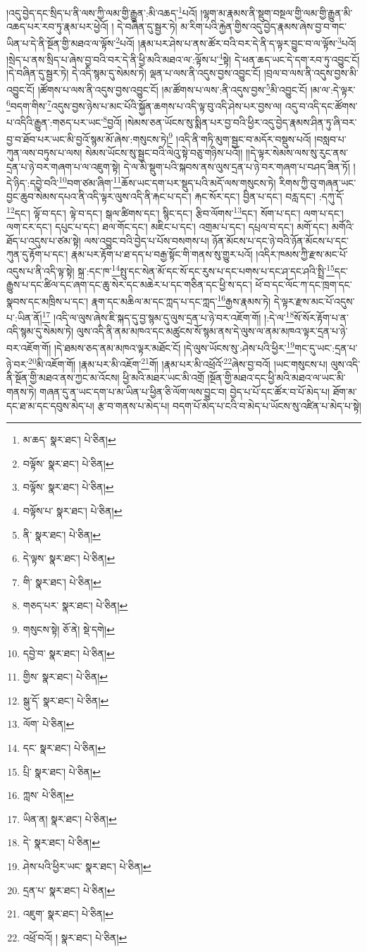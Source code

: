 །འདུ་བྱེད་དང་སྲིད་པ་ནི་ལས་ཀྱི་ལམ་གྱི་རྒྱུན་:མི་འཆད་\footnote{མ་ཆད་  སྣར་ཐང་།  པེ་ཅིན། }པའོ། །ལྷག་མ་རྣམས་ནི་སྡུག་བསྔལ་གྱི་ལམ་གྱི་རྒྱུན་མི་འཆད་པར་རབ་ཏུ་རྣམ་པར་ཕྱེའོ། །
དེ་བཞིན་དུ་སྦྱར་ཏེ། མ་རིག་པའི་རྐྱེན་གྱིས་འདུ་བྱེད་རྣམས་ཞེས་བྱ་བ་གང་ཡིན་པ་དེ་ནི་སྔོན་གྱི་མཐའ་ལ་ལྟོས་\footnote{བལྟོས་  སྣར་ཐང་།  པེ་ཅིན། }པའོ། །རྣམ་པར་ཤེས་པ་ནས་ཚོར་བའི་བར་དེ་ནི་ད་ལྟར་བྱུང་བ་ལ་ལྟོས་\footnote{བལྟོས་  སྣར་ཐང་།  པེ་ཅིན། }པའོ། །སྲེད་པ་ནས་སྲིད་པ་ཞེས་བྱ་བའི་བར་དེ་ནི་ཕྱི་མའི་མཐའ་ལ་:ལྟོས་པ་\footnote{བལྟོས་པ་  སྣར་ཐང་།  པེ་ཅིན། }སྟེ། དེ་ཕན་ཆད་ཡང་དེ་དག་རབ་ཏུ་འབྱུང་ངོ། །དེ་བཞིན་དུ་སྦྱར་ཏེ། དེ་འདི་སྙམ་དུ་སེམས་ཏེ། ལྡན་པ་ལས་ནི་འདུས་བྱས་འབྱུང་ངོ། །བྲལ་བ་ལས་ནི་འདུས་བྱས་མི་འབྱུང་ངོ། །ཚོགས་པ་ལས་ནི་འདུས་བྱས་འབྱུང་ངོ། །མ་ཚོགས་པ་ལས་:ནི་འདུས་བྱས་\footnote{ནི་  སྣར་ཐང་།  པེ་ཅིན། }མི་འབྱུང་ངོ། །མ་ལ་:དེ་ལྟར་\footnote{དེ་ལྟས་  སྣར་ཐང་།  པེ་ཅིན། }བདག་གིས་\footnote{གི་  སྣར་ཐང་།  པེ་ཅིན། }འདུས་བྱས་ཉེས་པ་མང་པོའི་སྐྱོན་ཆགས་པ་འདི་ལྟ་བུ་འདི་ཤེས་པར་བྱས་ལ། འདུ་བ་འདི་དང་ཚོགས་པ་འདིའི་རྒྱུན་:གཅད་པར་ཡང་\footnote{གཅད་པར་  སྣར་ཐང་།  པེ་ཅིན། }བྱའོ། །སེམས་ཅན་ཡོངས་སུ་སྨིན་པར་བྱ་བའི་ཕྱིར་འདུ་བྱེད་རྣམས་ཤིན་ཏུ་ཞི་བར་བྱ་བ་ཐོབ་པར་ཡང་མི་བྱའོ་སྙམ་མོ་ཞེས་:གསུངས་ཏེ།\footnote{གསུངས་སྟེ།  ཅོ་ནེ།  སྡེ་དགེ། } །འདི་ནི་གཏི་མུག་སྦྱང་བ་མདོར་བསྡུས་པའོ། །བསླབ་པ་ཀུན་ལས་བཏུས་པ་ལས། སེམས་ཡོངས་སུ་སྦྱང་བའི་ལེའུ་སྟེ་བཅུ་གཉིས་པའོ།། །།དེ་ལྟར་སེམས་ལས་སུ་རུང་ནས་དྲན་པ་ཉེ་བར་གཞག་པ་ལ་འཇུག་སྟེ། དེ་ལ་མི་སྡུག་པའི་སྐབས་ནས་ལུས་དྲན་པ་ཉེ་བར་གཞག་པ་བཤད་ཟིན་ཏོ། །དེ་ཉིད་:དབྱེ་བའི་\footnote{དབྱེ་བ་  སྣར་ཐང་།  པེ་ཅིན། }བག་ཙམ་ཞིག་\footnote{གྱིས་  སྣར་ཐང་།  པེ་ཅིན། }ཆོས་ཡང་དག་པར་སྡུད་པའི་མདོ་ལས་གསུངས་ཏེ། རིགས་ཀྱི་བུ་གཞན་ཡང་བྱང་ཆུབ་སེམས་དཔའ་ནི་འདི་ལྟར་ལུས་འདི་ནི་རྐང་པ་དང་། རྐང་སོར་དང་། བྱིན་པ་དང་། བརླ་དང་། :དཀུ་དོ་\footnote{སྒུ་དོ་  སྣར་ཐང་།  པེ་ཅིན། }དང་། ལྟོ་བ་དང་། ལྟེ་བ་དང་། སྒལ་ཚིགས་དང་། སྙིང་དང་། རྩིབ་ལོགས་\footnote{ལོག་  པེ་ཅིན། }དང་། སོག་པ་དང་། ལག་པ་དང་། ལག་ངར་དང་། དཔུང་པ་དང་། ཐལ་གོང་དང་། མཇིང་པ་དང་། འགྲམ་པ་དང་། དཔྲལ་བ་དང་། མགོ་དང་། མགོའི་ཐོད་པ་འདུས་པ་ཙམ་སྟེ། ལས་འབྱུང་བའི་བྱེད་པ་པོས་བསགས་པ། ཉོན་མོངས་པ་དང་ཉེ་བའི་ཉོན་མོངས་པ་དང་ཀུན་དུ་རྟོག་པ་དང་། རྣམ་པར་རྟོག་པ་ཐ་དད་པ་བརྒྱ་སྟོང་གི་གནས་སུ་གྱུར་པའོ། །འདིར་ཁམས་ཀྱི་རྫས་མང་པོ་འདུས་པ་ནི་འདི་ལྟ་སྟེ། སྐྲ་:དང་ཁ་\footnote{དང་  སྣར་ཐང་།  པེ་ཅིན། }སྤུ་དང་སེན་མོ་དང་སོ་དང་རུས་པ་དང་པགས་པ་དང་ཤ་དང་ཤའི་སྤྲི་\footnote{པྲི་  སྣར་ཐང་།  པེ་ཅིན། }དང་རྒྱུས་པ་དང་ཚིལ་དང་ཞག་དང་ཆུ་སེར་དང་མཆེར་པ་དང་གཅིན་དང་ཕྱི་ས་དང་། ཕོ་བ་དང་ལོང་ཀ་དང་ཁྲག་དང་སྣབས་དང་མཁྲིས་པ་དང་། རྣག་དང་མཆིལ་མ་དང་ཀླད་པ་དང་ཀླད་\footnote{ཀླས་  པེ་ཅིན། }རྒྱས་རྣམས་ཏེ། དེ་ལྟར་རྫས་མང་པོ་འདུས་པ་:ཡིན་ནོ།\footnote{ཡིན་ན།  སྣར་ཐང་།  པེ་ཅིན། } །འདི་ལ་ལུས་ཞེས་ཇི་སྐད་དུ་བྱ་སྙམ་དུ་ལུས་དྲན་པ་ཉེ་བར་འཇོག་གོ། །:དེ་ལ་\footnote{དེ་  སྣར་ཐང་།  པེ་ཅིན། }སོ་སོར་རྟོག་པ་ན་འདི་སྙམ་དུ་སེམས་ཏེ། ལུས་འདི་ནི་ནམ་མཁའ་དང་མཚུངས་སོ་སྙམ་ནས་དེ་ལུས་ལ་ནམ་མཁའ་ལྟར་དྲན་པ་ཉེ་བར་འཇོག་གོ། །དེ་ཐམས་ཅད་ནམ་མཁའ་ལྟར་མཐོང་ངོ། །དེ་ལུས་ཡོངས་སུ་:ཤེས་པའི་ཕྱིར་\footnote{ཤེས་པའི་ཕྱིར་ཡང་  སྣར་ཐང་།  པེ་ཅིན། }གང་དུ་ཡང་:དྲན་པ་ཉེ་བར་\footnote{དྲན་པ་  སྣར་ཐང་།  པེ་ཅིན། }མི་འཇོག་གོ། །རྣམ་པར་མི་འཇོག་\footnote{འཇུག་  སྣར་ཐང་།  པེ་ཅིན། }གོ། །རྣམ་པར་མི་འཕྲོའོ་\footnote{འཕྲོ་བའོ། །  སྣར་ཐང་།  པེ་ཅིན། }ཞེས་བྱ་བའོ། །ཡང་གསུངས་པ། ལུས་འདི་ནི་སྔོན་གྱི་མཐའ་ནས་ཀྱང་མ་འོངས། ཕྱི་མའི་མཐར་ཡང་མི་འགྲོ །སྔོན་གྱི་མཐའ་དང་ཕྱི་མའི་མཐའ་ལ་ཡང་མི་གནས་ཏེ། གཞན་དུ་ན་ཡང་དག་པ་མ་ཡིན་པ་ཕྱིན་ཅི་ལོག་ལས་བྱུང་བ། བྱེད་པ་པོ་དང་ཚོར་བ་པོ་མེད་པ། ཐོག་མ་དང་ཐ་མ་དང་དབུས་མེད་པ། རྩ་བ་གནས་པ་མེད་པ། བདག་པོ་མེད་པ་ངའི་བ་མེད་པ་ཡོངས་སུ་འཛིན་པ་མེད་པ་སྟེ། 